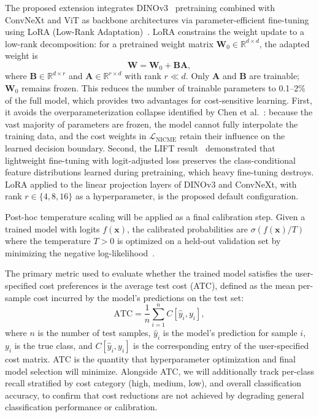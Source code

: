 \documentclass[11pt, letterpaper]{article}
\begin{document}
The proposed extension integrates DINOv3~\cite{darcet2025dinov3} pretraining combined with ConvNeXt and ViT as backbone architectures via
parameter-efficient fine-tuning using LoRA (Low-Rank
Adaptation)~\cite{hu2022lora}. LoRA constrains the weight update to a low-rank
decomposition: for a pretrained weight matrix
$\mathbf{W}_0 \in \mathbb{R}^{d \times d}$, the adapted weight is
%
\begin{equation}
\label{eq:lora}
\mathbf{W} = \mathbf{W}_0 + \mathbf{B}\mathbf{A},
\end{equation}
%
where $\mathbf{B} \in \mathbb{R}^{d \times r}$ and
$\mathbf{A} \in \mathbb{R}^{r \times d}$ with rank $r \ll d$. Only
$\mathbf{A}$ and $\mathbf{B}$ are trainable; $\mathbf{W}_0$ remains frozen.
This reduces the number of trainable parameters to 0.1--2\% of the full model,
which provides two advantages for cost-sensitive learning. First, it avoids the
overparameterization collapse identified by Chen et
al.~\cite{chen2025csada}: because the vast majority of parameters are frozen,
the model cannot fully interpolate the training data, and the cost weights in
$\mathcal{L}_{\mathrm{NICME}}$ retain their influence on the learned decision
boundary. Second, the LIFT result~\cite{tian2024lift} demonstrated that
lightweight fine-tuning with logit-adjusted loss preserves the class-conditional
feature distributions learned during pretraining, which heavy fine-tuning
destroys. LoRA applied to the linear projection layers of DINOv3 and
ConvNeXt, with rank $r \in \{4, 8, 16\}$ as a hyperparameter, is the
proposed default configuration.

Post-hoc temperature scaling will be applied as a final calibration step. Given
a trained model with logits $f(\mathbf{x})$, the calibrated probabilities are
$\sigma(f(\mathbf{x}) / T)$ where the temperature $T > 0$ is optimized on a
held-out validation set by minimizing the negative
log-likelihood~\cite{guo2017calibration}.

The primary metric used to evaluate whether the trained model satisfies the
user-specified cost preferences is the average test cost (ATC), defined as the
mean per-sample cost incurred by the model's predictions on the test set:
\begin{equation}
\label{eq:atc}
\mathrm{ATC} = \frac{1}{n} \sum_{i=1}^{n} C[\hat{y}_i, y_i],
\end{equation}
%
where $n$ is the number of test samples, $\hat{y}_i$ is the model's prediction
for sample $i$, $y_i$ is the true class, and $C[\hat{y}_i, y_i]$ is the
corresponding entry of the user-specified cost matrix. ATC is the quantity
that hyperparameter optimization and final model selection will minimize.
Alongside ATC, we will additionally track per-class recall stratified by cost
category (high, medium, low), and overall classification accuracy, to confirm that cost reductions are not achieved by
degrading general classification performance or calibration. 
\end{document}
